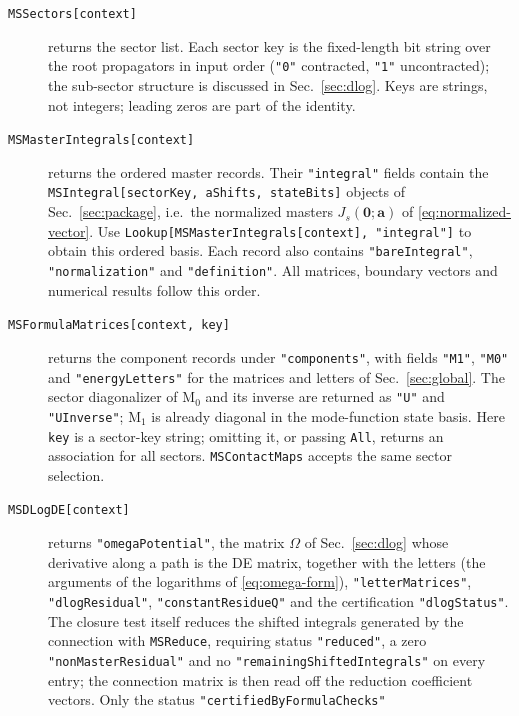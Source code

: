 \documentclass[11pt,a4paper]{article}
\numberwithin{table}{section}
\begin{document}
\begin{description}
  \item[\texttt{MSSectors[context]}] returns the sector list. Each sector key is the fixed-length
        bit string over the root propagators in input order (\texttt{"0"} contracted,
        \texttt{"1"} uncontracted); the
        sub-sector structure is discussed in Sec.~\ref{sec:dlog}. Keys are
        strings, not integers; leading zeros are part of the identity.
  \item[\texttt{MSMasterIntegrals[context]}] returns the ordered master records.
        Their \texttt{"integral"} fields contain the
        \texttt{MSIntegral[sectorKey, aShifts, stateBits]} objects of Sec.~\ref{sec:package}, i.e.\
        the normalized masters $J_s(\bm 0;\bm a)$ of \eqref{eq:normalized-vector}.
        Use \texttt{Lookup[MSMasterIntegrals[context], "integral"]} to obtain this ordered basis.
        Each record also contains \texttt{"bareIntegral"}, \texttt{"normalization"} and
        \texttt{"definition"}. All matrices, boundary vectors and numerical results follow this order.
  \item[\texttt{MSFormulaMatrices[context, key]}] returns the component records under
        \texttt{"components"}, with fields \texttt{"M1"}, \texttt{"M0"} and
        \texttt{"energyLetters"} for the matrices and letters of Sec.~\ref{sec:global}.
        The sector diagonalizer of $\text{M}_0$ and its inverse are returned as
        \texttt{"U"} and \texttt{"UInverse"}; $\text{M}_1$ is already diagonal in the mode-function state basis.
        Here \texttt{key} is a sector-key string; omitting it, or passing \texttt{All},
        returns an association for all sectors. \texttt{MSContactMaps} accepts the same
        sector selection.
  \item[\texttt{MSDLogDE[context]}] returns \texttt{"omegaPotential"}, the matrix $\Omega$ of
        Sec.~\ref{sec:dlog} whose derivative along a path is the DE matrix, together with the
        letters (the arguments of the logarithms of \eqref{eq:omega-form}),
        \texttt{"letterMatrices"}, \texttt{"dlogResidual"}, \texttt{"constantResidueQ"} and the
        certification \texttt{"dlogStatus"}. The closure test itself reduces the shifted integrals
        generated by the connection with \texttt{MSReduce}, requiring status \texttt{"reduced"}, a
        zero \texttt{"nonMasterResidual"} and no \texttt{"remainingShiftedIntegrals"} on every
        entry; the connection matrix is then read off the reduction coefficient vectors. Only the
        status \texttt{"certifiedByFormulaChecks"}

\end{description}
\end{document}
